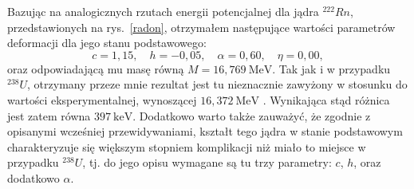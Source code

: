\documentclass[a4paper,polish]{article}
\numberwithin{equation}{section}
\begin{document}
Bazując na analogicznych rzutach energii potencjalnej dla jądra $^{222}Rn$, przedstawionych na rys.~\ref{radon}, otrzymałem następujące wartości parametrów deformacji dla jego stanu podstawowego:
\begin{equation*}
c=1,15, \quad h=-0,05, \quad \alpha=0,60, \quad \eta= 0,00,
\end{equation*}
oraz odpowiadającą mu masę równą $M=16,769~\mathrm{MeV}$. Tak jak i w przypadku $^{238}U$, otrzymany przeze mnie rezultat jest tu nieznacznie zawyżony w stosunku do wartości eksperymentalnej, wynoszącej $16,372~\mathrm{MeV}$ \cite{brookhaven}. Wynikająca stąd różnica jest zatem równa $397~\mathrm{keV}$. Dodatkowo warto także zauważyć, że zgodnie z opisanymi wcześniej przewidywaniami, kształt tego jądra w stanie podstawowym charakteryzuje się większym stopniem komplikacji niż miało to miejsce w przypadku $^{238}U$, tj. do jego opisu wymagane są tu trzy parametry: $c$, $h$, oraz dodatkowo $\alpha$. 
\end{document}

